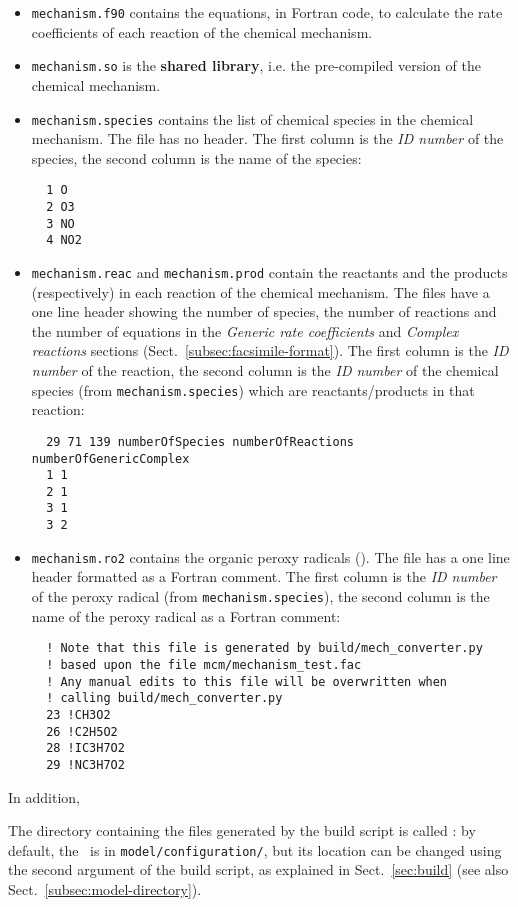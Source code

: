 \begin{itemize}
\item \texttt{mechanism.f90} contains the equations, in Fortran code,
  to calculate the rate coefficients of each reaction of the chemical
  mechanism.
\item \texttt{mechanism.so} is the \textbf{shared library}, i.e. the
  pre-compiled version of the chemical mechanism.
\item \texttt{mechanism.species} contains the list of chemical species
  in the chemical mechanism. The file has no header. The first column
  is the \emph{ID number} of the species, the second column is the
  name of the species:
  \begin{verbatim}
  1 O
  2 O3
  3 NO
  4 NO2
  \end{verbatim}
\item \texttt{mechanism.reac} and \texttt{mechanism.prod} contain the
  reactants and the products (respectively) in each reaction of the
  chemical mechanism. The files have a one line header showing the
  number of species, the number of reactions and the number of
  equations in the \emph{Generic rate coefficients} and
  \emph{Complex reactions} sections (Sect.~\ref{subsec:facsimile-format}).
  The first column is the \emph{ID number} of the reaction, the second
  column is the \emph{ID number} of the chemical species (from
  \texttt{mechanism.species}) which are reactants/products in that
  reaction:
  \begin{verbatim}
  29 71 139 numberOfSpecies numberOfReactions numberOfGenericComplex
  1 1
  2 1
  3 1
  3 2
\end{verbatim}
\item \texttt{mechanism.ro2} contains the organic peroxy radicals
  (). The file has a one line header formatted as a Fortran
  comment. The first column is the \emph{ID number} of the peroxy
  radical (from \texttt{mechanism.species}), the second column is the
  name of the peroxy radical as a Fortran comment:
  \begin{verbatim}
  ! Note that this file is generated by build/mech_converter.py
  ! based upon the file mcm/mechanism_test.fac
  ! Any manual edits to this file will be overwritten when
  ! calling build/mech_converter.py
  23 !CH3O2
  26 !C2H5O2
  28 !IC3H7O2
  29 !NC3H7O2
  \end{verbatim}
\end{itemize}

In addition,                

The directory containing the files generated by the build script is
called \sharedir: by default, the \sharedir\ is in
\texttt{model/configuration/}, but its location can be changed using
the second argument of the build script, as explained in
Sect.~\ref{sec:build} (see also Sect.~\ref{subsec:model-directory}).

